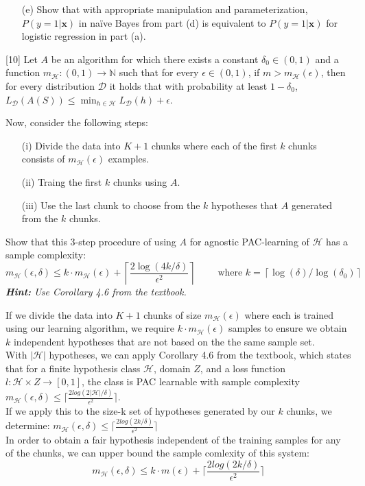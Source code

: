 \documentclass[11pt, fleqn]{exam}
\newenvironment{mathline}{\begin{adjustwidth}{1cm}{}}{\end{adjustwidth}}
\begin{document}
\begin{questions}
\begin{itemize}
\item[(e)] Show that with appropriate manipulation and parameterization, $P(y=1|\mathbf{x})$ in na\"{i}ve Bayes from part (d) is equivalent to $P(y=1|\mathbf{x})$ for logistic regression in part (a).
\end{itemize}

[10]
Let $A$ be an algorithm for which there exists a constant $\delta_0 \in (0,1)$ and a function $m_\mathcal{H}: (0,1) \rightarrow \mathbb{N}$ such that for every $\epsilon \in (0,1)$, if $m > m_\mathcal{H}(\epsilon)$, then for every distribution $\mathcal{D}$ it holds that with probability at least $1 - \delta_0$, $L_\mathcal{D}(A(S)) \leq \min_{h \in \mathcal{H}} L_\mathcal{D}(h) + \epsilon$.

Now, consider the following steps:
\begin{itemize}[nolistsep, noitemsep]
\item[(i)] Divide the data into $K+1$ chunks where each of the first $k$ chunks consists of $m_\mathcal{H}(\epsilon)$ examples.
\item[(ii)] Traing the first $k$ chunks using $A$.
\item[(iii)] Use the last chunk to choose from the $k$ hypotheses that $A$ generated from the $k$ chunks.
\end{itemize}

Show that this 3-step procedure of using $A$ for agnostic PAC-learning of $\mathcal{H}$ has a sample complexity:
\begin{equation*}
m_\mathcal{H}(\epsilon, \delta) \leq k \cdot m_\mathcal{H}(\epsilon) + \left\lceil \frac{2\log(4k/\delta)}{\epsilon^2} \right\rceil \qquad \text{ where } k = \left\lceil \log(\delta)/\log(\delta_0) \right\rceil
\end{equation*}
\textit{\textbf{Hint:} Use Corollary 4.6 from the textbook.}

\begin{mathline}
If we divide the data into $K+1$ chunks of size $m_\mathcal{H}(\epsilon)$ where each is trained using our learning algorithm, we require $k\cdot m_\mathcal{H}(\epsilon)$ samples to ensure we obtain $k$ independent hypotheses that are not based on the the same sample set.\\
With $|\mathcal{H}|$ hypotheses, we can apply Corollary 4.6 from the textbook, which states that for a finite hypothesis class $\mathcal{H}$, domain $Z$, and a loss function $l:\mathcal{H}\times Z\rightarrow [0,1]$, the class is PAC learnable with sample complexity $m_\mathcal{H}(\epsilon,\delta)\leq\lceil\frac{2log(2|\mathcal{H}|/\delta)}{\epsilon^2}\rceil$.\\
If we apply this to the size-k set of hypotheses generated by our $k$ chunks, we determine:
$m_\mathcal{H}(\epsilon,\delta)\leq\lceil\frac{2log(2k/\delta)}{\epsilon^2}\rceil$\\
In order to obtain a fair hypothesis independent of the training samples for any of the chunks, we can upper bound the sample comlexity of this system:
$$m_\mathcal{H}(\epsilon,\delta)\leq k\cdot m(\epsilon)+ \lceil\frac{2log(2k/\delta)}{\epsilon^2}\rceil$$
\end{mathline}


\end{questions}
\end{document}
